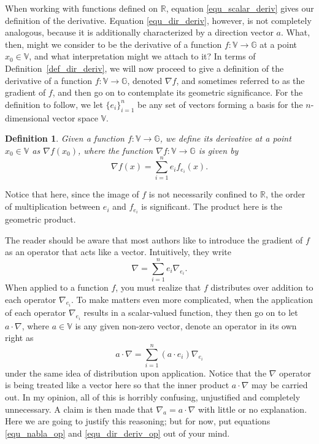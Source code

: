 \documentclass[12pt]{article}
\newcommand{\G}{\mathbb{G}}
\newcommand{\V}{\mathbb{V}}
\newcommand{\R}{\mathbb{R}}
\newtheorem{definition}{Definition}[section]
\begin{document}
When working with functions defined on $\R$, equation \eqref{equ_scalar_deriv} gives
our definition of the derivative.  Equation \eqref{equ_dir_deriv}, however, is not
completely analogous, because it is additionally characterized by a
direction vector $a$.  What, then, might we consider to be the derivative of a function $f:\V\to\G$
at a point $x_0\in\V$, and what interpretation might we attach to it?
In terms of Definition~\ref{def_dir_deriv}, we will  now proceed to give a definition
of the derivative of a function $f:\V\to\G$, denoted $\nabla f$, and sometimes referred
to as the gradient of $f$, and then go on to contemplate its geometric significance.
For the definition to follow, we let $\{e_i\}_{i=1}^n$ be any set of vectors forming
a basis for the $n$-dimensional vector space $\V$.
\begin{definition}\label{def_vec_diriv}
Given a function $f:\V\to\G$, we define its derivative at a point $x_0\in\V$
as $\nabla f(x_0)$, where the function $\nabla f:\V\to\G$ is given by
\begin{equation}\label{equ_vec_deriv}
\nabla f(x) = \sum_{i=1}^n e_if_{e_i}(x).
\end{equation}
\end{definition}
Notice that here, since the image of $f$ is not necessarily confined to $\R$,
the order of multiplication between $e_i$ and $f_{e_i}$ is significant.
The product here is the geometric product.

The reader should be aware that most authors like to introduce the gradient
of $f$ as an operator that acts like a vector.  Intuitively, they write
\begin{equation}\label{equ_nabla_op}
\nabla = \sum_{i=1}^n e_i\nabla_{e_i}.
\end{equation}
When applied to a function $f$, you must realize that $f$ distributes over addition to
each operator $\nabla_{e_i}$.
To make matters even more complicated, when the application of each operator $\nabla_{e_i}$
results in a scalar-valued function, they then go on to let $a\cdot\nabla$, where $a\in\V$
is any given non-zero vector, denote an operator in its own right as
\begin{equation}\label{equ_dir_deriv_op}
a\cdot\nabla = \sum_{i=1}^n (a\cdot e_i)\nabla_{e_i}
\end{equation}
under the same idea of distribution upon application.  Notice that the $\nabla$ operator
is being treated like a vector here so that the inner product $a\cdot\nabla$ may be carried out.
In my opinion, all of this is horribly confusing, unjustified and completely unnecessary.
A claim is then made that $\nabla_a=a\cdot\nabla$ with little or no explanation.  Here we are
going to justify this reasoning; but for now, put equations \eqref{equ_nabla_op} and \eqref{equ_dir_deriv_op}
out of your mind.
\end{document}
